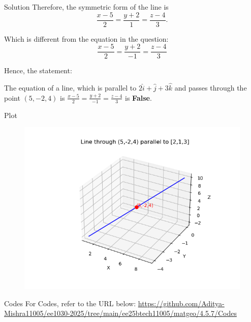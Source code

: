 \documentclass{beamer}
\begin{document}
\begin{frame}{Solution}
Therefore, the symmetric form of the line is
\[
\boxed{\frac{x - 5}{2} = \frac{y + 2}{1} = \frac{z - 4}{3}}.
\]

Which is different from the equation in the question:
\[
\frac{x - 5}{2} = \frac{y + 2}{-1} = \frac{z - 4}{3}
\]

Hence, the statement:

	The equation of a line, which is parallel to $2\hat{i} + \hat{j} + 3\hat{k}$ and passes through the point $(5, -2, 4)$ is $\frac{x - 5}{2} = \frac{y + 2}{-1} = \frac{z - 4}{3}$ is \textbf{False}.
\end{frame}
\begin{frame}{Plot}
\begin{figure}
    \centering
    \includegraphics[width=0.8\columnwidth]{Figs/Figure.png}
\end{figure}
\end{frame}

\begin{frame}{Codes}
\centering
For Codes, refer to the URL below:  
\url{https://github.com/Aditya-Mishra11005/ee1030-2025/tree/main/ee25btech11005/matgeo/4.5.7/Codes}
\end{frame}
\end{document}

